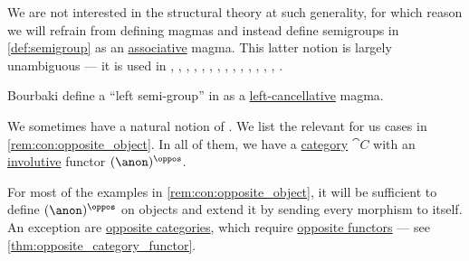 \begin{remark}
  We are not interested in the structural theory at such generality, for which reason we will refrain from defining magmas and instead define semigroups in \cref{def:semigroup} as an \hyperref[def:binary_operation/associative]{associative} magma. This latter notion is largely unambiguous --- it is used in
  \cite[144]{MacLane1998CategoryTheory},
  \cite[29]{Jacobson1985BasicAlgebraI},
  \cite[133]{Rotman2015AdvancedModernAlgebraPart1},
  \cite[126]{Aluffi2009Algebra},
  \cite[145]{Knauer2019AlgebraicGraphTheory},
  \cite[def. 8.2.1]{HillePhillips1996FunctionalAnalysis},
  \cite[56]{Savage2008ModelsOfComputation},
  \cite[1]{Golan1999Semirings},
  \cite[2]{Pin1998TropicalSemirings},
  \cite[28]{Ляпин1960Полугруппы},
  \cite[90]{Мальцев1970АлгебраическиеСистемы},
  \cite[34]{Курош1973ОбщаяАлгебра},
  \cite[135]{Кострикин2020АлгебраЧасть1},
  \cite[121]{БелоусовТкачёв2004ДискретнаяМатематика},
  \cite[\S 2.2.1]{Новиков2013ДискретнаяМатематика}.

  Bourbaki define a \enquote{left semi-group} in \cite[exerc. I.2.11]{Bourbaki1998Algebra1to3} as a \hyperref[def:binary_operation/cancellative]{left-cancellative} magma.
\end{remark}

\begin{concept}\label{con:opposite_object}\mimprovised
  We sometimes have a natural notion of . We list the relevant for us cases in \cref{rem:con:opposite_object}. In all of them, we have a \hyperref[def:category]{category} \( \cat{C} \) with an \hyperref[def:categorical_involution]{involutive} functor \( (\anon)^\oppos \).
\end{concept}
\begin{comments}
  \item For most of the examples in \cref{rem:con:opposite_object}, it will be sufficient to define \( (\anon)^\oppos \) on objects and extend it by sending every morphism to itself. An exception are \hyperref[def:opposite_category]{opposite categories}, which require \hyperref[def:opposite_functor]{opposite functors} --- see \cref{thm:opposite_category_functor}.
\end{comments}

